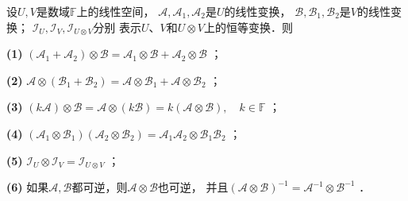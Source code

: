 \begin{proposition}
    设$U,V$是数域$\mathbb{F}$上的线性空间，
    $\mathcal{A},\mathcal{A}_1,\mathcal{A}_2$是$U$的线性变换，
    $\mathcal{B},\mathcal{B}_1,\mathcal{B}_2$是$V$的线性变换；
    $\mathcal{I}_U,\mathcal{I}_V,\mathcal{I}_{U\otimes V}$分别
    表示$U$、$V$和$U\otimes V$上的恒等变换．则

    {\bfseries (1)} $(\mathcal{A}_1 + \mathcal{A}_2)\otimes \mathcal{B}
        =\mathcal{A}_1\otimes \mathcal{B} + \mathcal{A}_2\otimes \mathcal{B}$ ；

    {\bfseries (2)} $\mathcal{A}\otimes (\mathcal{B}_1 + \mathcal{B}_2)
        =\mathcal{A}\otimes \mathcal{B}_1 + \mathcal{A}\otimes \mathcal{B}_2$ ；

    {\bfseries (3)} $ (k\mathcal{A})\otimes \mathcal{B} = \mathcal{A}\otimes (k\mathcal{B})
         = k(\mathcal{A}\otimes \mathcal{B}), \quad k\in \mathbb{F} $ ；

    {\bfseries (4)} $(\mathcal{A}_1\otimes \mathcal{B}_1)(\mathcal{A}_2\otimes \mathcal{B}_2)
         = \mathcal{A}_1\mathcal{A}_2\otimes \mathcal{B}_1\mathcal{B}_2$ ；

    {\bfseries (5)} $\mathcal{I}_U \otimes \mathcal{I}_V =\mathcal{I}_{U\otimes V}$ ；

    {\bfseries (6)} 如果$\mathcal{A},\mathcal{B}$都可逆，则$\mathcal{A}\otimes\mathcal{B}$也可逆，
        并且$(\mathcal{A}\otimes\mathcal{B})^{-1}=\mathcal{A}^{-1}\otimes\mathcal{B}^{-1}$ ．
\end{proposition}

